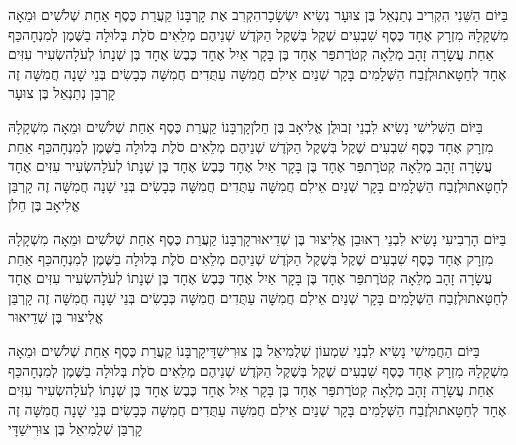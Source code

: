 \documentclass[../main/main.tex]{subfiles}
\begin{document}
\begin{multicols*}{\ncols}
בַּיּוֹם הַשֵּׁנִי הִקְרִיב נְתַנְאֵל בֶּן צוּעָר נְשִׂיא יִשְׂשָׂכָר\PreVerseSpace{}הִקְרִב אֶת קָרְבָּנוֹ קַעֲרַת כֶּסֶף אַחַת שְׁלֹשִׁים וּמֵאָה מִשְׁקָלָהּ מִזְרָק אֶחָד כֶּסֶף שִׁבְעִים שֶׁקֶל בְּשֶׁקֶל הַקֹּדֶשׁ שְׁנֵיהֶם מְלֵאִים סֹלֶת בְּלוּלָה בַשֶּׁמֶן לְמִנְחָה\PreVerseSpace{}כַּף אַחַת עֲשָׂרָה זָהָב מְלֵאָה קְטֹרֶת\PreVerseSpace{}פַּר אֶחָד בֶּן בָּקָר אַיִל אֶחָד כֶּבֶשׂ אֶחָד בֶּן שְׁנָתוֹ לְעֹלָה\PreVerseSpace{}שְׂעִיר עִזִּים אֶחָד לְחַטָּאת\PreVerseSpace{}וּלְזֶבַח הַשְּׁלָמִים בָּקָר שְׁנַיִם אֵילִם חֲמִשָּׁה עַתֻּדִים חֲמִשָּׁה כְּבָשִׂים בְּנֵי שָׁנָה חֲמִשָּׁה זֶה קָרְבַּן נְתַנְאֵל בֶּן צוּעָר\OpenSection{}\par
{}בַּיּוֹם הַשְּׁלִישִׁי נָשִׂיא לִבְנֵי זְבוּלֻן אֱלִיאָב בֶּן חֵלֹן\PreVerseSpace{}קָרְבָּנוֹ קַעֲרַת כֶּסֶף אַחַת שְׁלֹשִׁים וּמֵאָה מִשְׁקָלָהּ מִזְרָק אֶחָד כֶּסֶף שִׁבְעִים שֶׁקֶל בְּשֶׁקֶל הַקֹּדֶשׁ שְׁנֵיהֶם מְלֵאִים סֹלֶת בְּלוּלָה בַשֶּׁמֶן לְמִנְחָה\PreVerseSpace{}כַּף אַחַת עֲשָׂרָה זָהָב מְלֵאָה קְטֹרֶת\PreVerseSpace{}פַּר אֶחָד בֶּן בָּקָר אַיִל אֶחָד כֶּבֶשׂ אֶחָד בֶּן שְׁנָתוֹ לְעֹלָה\PreVerseSpace{}שְׂעִיר עִזִּים אֶחָד לְחַטָּאת\PreVerseSpace{}וּלְזֶבַח הַשְּׁלָמִים בָּקָר שְׁנַיִם אֵילִם חֲמִשָּׁה עַתֻּדִים חֲמִשָּׁה כְּבָשִׂים בְּנֵי שָׁנָה חֲמִשָּׁה זֶה קָרְבַּן אֱלִיאָב בֶּן חֵלֹן\OpenSection{}\par
{}בַּיּוֹם הָרְבִיעִי נָשִׂיא לִבְנֵי רְאוּבֵן אֱלִיצוּר בֶּן שְׁדֵיאוּר\PreVerseSpace{}קָרְבָּנוֹ קַעֲרַת כֶּסֶף אַחַת שְׁלֹשִׁים וּמֵאָה מִשְׁקָלָהּ מִזְרָק אֶחָד כֶּסֶף שִׁבְעִים שֶׁקֶל בְּשֶׁקֶל הַקֹּדֶשׁ שְׁנֵיהֶם מְלֵאִים סֹלֶת בְּלוּלָה בַשֶּׁמֶן לְמִנְחָה\PreVerseSpace{}כַּף אַחַת עֲשָׂרָה זָהָב מְלֵאָה קְטֹרֶת\PreVerseSpace{}פַּר אֶחָד בֶּן בָּקָר אַיִל אֶחָד כֶּבֶשׂ אֶחָד בֶּן שְׁנָתוֹ לְעֹלָה\PreVerseSpace{}שְׂעִיר עִזִּים אֶחָד לְחַטָּאת\PreVerseSpace{}וּלְזֶבַח הַשְּׁלָמִים בָּקָר שְׁנַיִם אֵילִם חֲמִשָּׁה עַתֻּדִים חֲמִשָּׁה כְּבָשִׂים בְּנֵי שָׁנָה חֲמִשָּׁה זֶה קָרְבַּן אֱלִיצוּר בֶּן שְׁדֵיאוּר\OpenSection{}\par
{}בַּיּוֹם הַחֲמִישִׁי נָשִׂיא לִבְנֵי שִׁמְעוֹן שְׁלֻמִיאֵל בֶּן צוּרִישַׁדָּי\PreVerseSpace{}קָרְבָּנוֹ קַעֲרַת כֶּסֶף אַחַת שְׁלֹשִׁים וּמֵאָה מִשְׁקָלָהּ מִזְרָק אֶחָד כֶּסֶף שִׁבְעִים שֶׁקֶל בְּשֶׁקֶל הַקֹּדֶשׁ שְׁנֵיהֶם מְלֵאִים סֹלֶת בְּלוּלָה בַשֶּׁמֶן לְמִנְחָה\PreVerseSpace{}כַּף אַחַת עֲשָׂרָה זָהָב מְלֵאָה קְטֹרֶת\PreVerseSpace{}פַּר אֶחָד בֶּן בָּקָר אַיִל אֶחָד כֶּבֶשׂ אֶחָד בֶּן שְׁנָתוֹ לְעֹלָה\PreVerseSpace{}שְׂעִיר עִזִּים אֶחָד לְחַטָּאת\PreVerseSpace{}וּלְזֶבַח הַשְּׁלָמִים בָּקָר שְׁנַיִם אֵילִם חֲמִשָּׁה עַתֻּדִים חֲמִשָּׁה כְּבָשִׂים בְּנֵי שָׁנָה חֲמִשָּׁה זֶה קָרְבַּן שְׁלֻמִיאֵל בֶּן צוּרִישַׁדָּי\OpenSection{}\par

\end{multicols*}
\end{document}

